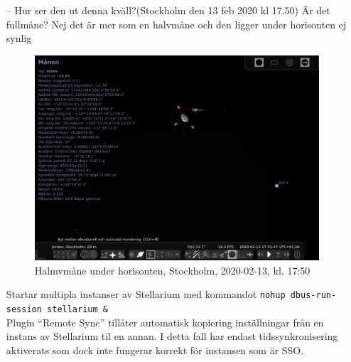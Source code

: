 \documentclass[./exercises.tex]{subfiles}
\begin{document}
\begin{itemize}
\item[--] Hur ser den ut denna kväll?(Stockholm den 13 feb 2020 kl 17.50) Är det fullmåne?
Nej det är mer som en halvmåne och den ligger under horisonten ej synlig
\begin{figure}[H]
\centering
  \includegraphics[scale=0.4]{stellarium-054.png}
  \caption{Halmvmåne under horisonten, Stockholm, 2020-02-13, kl. 17:50 }
  \label{fig4}
\end{figure}
Startar multipla instanser av Stellarium med kommandot 
\verb+nohup dbus-run-session stellarium &+\\
Plugin ``Remote Sync'' tillåter
automatisk kopiering inställningar från en instans av Stellarium til en annan. I detta
fall har endast tidssynkronisering aktiverats som dock inte fungerar korrekt
för instansen som är SSO.


\end{itemize}
\end{document}
